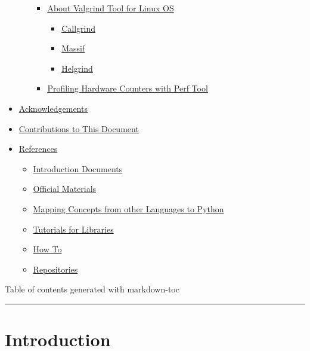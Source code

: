 \documentclass[
]{article}
\begin{document}
\begin{itemize}
\begin{itemize}
    \begin{itemize}
    \item
      \protect\hyperlink{about-valgrind-tool-for-linux-os}{About
      Valgrind Tool for Linux OS}

      \begin{itemize}
      \item
        \protect\hyperlink{callgrind}{Callgrind}
      \item
        \protect\hyperlink{massif}{Massif}
      \item
        \protect\hyperlink{helgrind}{Helgrind}
      \end{itemize}
    \item
      \protect\hyperlink{profiling-hardware-counters-with-perf-tool}{Profiling
      Hardware Counters with Perf Tool}
    \end{itemize}
  \end{itemize}
\item
  \protect\hyperlink{acknowledgements}{Acknowledgements}
\item
  \protect\hyperlink{contributions-to-this-document}{Contributions to
  This Document}
\item
  \protect\hyperlink{references}{References}

  \begin{itemize}
  \item
    \protect\hyperlink{introduction-documents}{Introduction Documents}
  \item
    \protect\hyperlink{official-materials}{Official Materials}
  \item
    \protect\hyperlink{mapping-concepts-from-other-languages-to-python}{Mapping
    Concepts from other Languages to Python}
  \item
    \protect\hyperlink{tutorials-for-libraries}{Tutorials for Libraries}
  \item
    \protect\hyperlink{how-to}{How To}
  \item
    \protect\hyperlink{repositories}{Repositories}
  \end{itemize}
\end{itemize}

Table of contents generated with markdown-toc

\begin{center}\rule{0.5\linewidth}{0.5pt}\end{center}

\hypertarget{introduction}{%
\section{Introduction}\label{introduction}}
\end{document}
